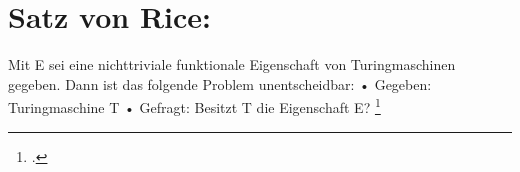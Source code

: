 \documentclass{lehramt-informatik-haupt}
\begin{document}
\section{Satz von Rice:}

Mit E sei eine nichttriviale funktionale Eigenschaft von Turingmaschinen
gegeben.
Dann ist das folgende Problem unentscheidbar:
• Gegeben: Turingmaschine T
• Gefragt: Besitzt T die Eigenschaft E?
\footcite[Seite 43]{theo:fs:4}
%
\end{document}
